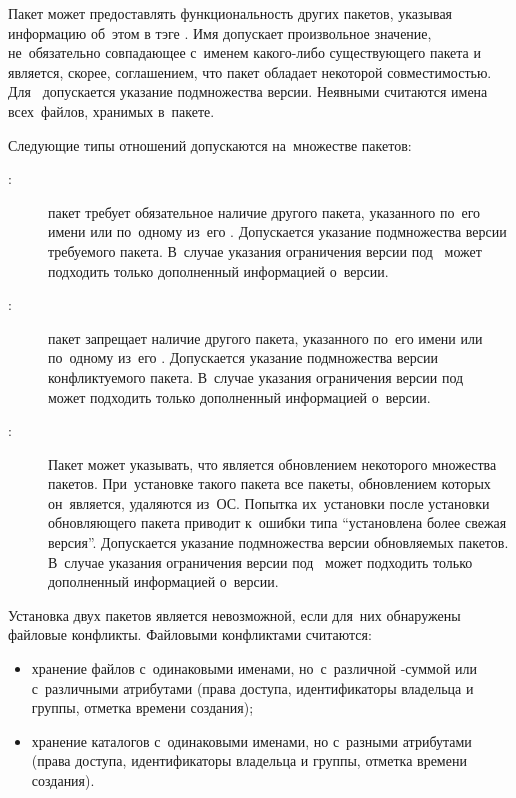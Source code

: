 Пакет может предоставлять функциональность других пакетов,
указывая информацию об~этом в тэге .
Имя  допускает произвольное значение, не~обязательно совпадающее с~именем какого-либо существующего пакета
и является, скорее, соглашением, что пакет обладает некоторой совместимостью.
Для~  допускается указание подмножества версии.
Неявными  считаются имена всех~файлов, хранимых в~пакете.

Следующие типы отношений допускаются на~множестве пакетов:

\begin{description}

\item[:]
пакет требует обязательное наличие другого пакета, указанного по~его имени или по~одному из~его .
Допускается указание подмножества версии требуемого пакета.
В~случае указания ограничения версии под~ может подходить  только дополненный информацией о~версии.

\item[:]
пакет запрещает наличие другого пакета, указанного по~его имени или по~одному из~его .
Допускается указание подмножества версии конфликтуемого пакета.
В~случае указания ограничения версии под~ может подходить  только дополненный информацией о~версии.

\item[:]
Пакет может указывать, что является обновлением некоторого множества пакетов.
При~установке такого пакета все пакеты, обновлением которых он~является, удаляются из~ОС.
Попытка их~установки после установки обновляющего пакета приводит к~ошибки типа ``установлена более свежая версия''.
Допускается указание подмножества версии обновляемых пакетов.
В~случае указания ограничения версии под~ может подходить  только дополненный информацией о~версии.

\end{description}

Установка двух пакетов является невозможной, если для~них обнаружены файловые конфликты.
Файловыми конфликтами считаются:

\begin{itemize}

\item {
хранение файлов с~одинаковыми именами, но~с~различной -суммой или с~различными атрибутами 
(права доступа, идентификаторы владельца и группы, отметка времени создания);
}

\item {
хранение каталогов с~одинаковыми именами, но с~разными атрибутами 
(права доступа, идентификаторы владельца и группы, отметка времени создания).
}

\end{itemize}

